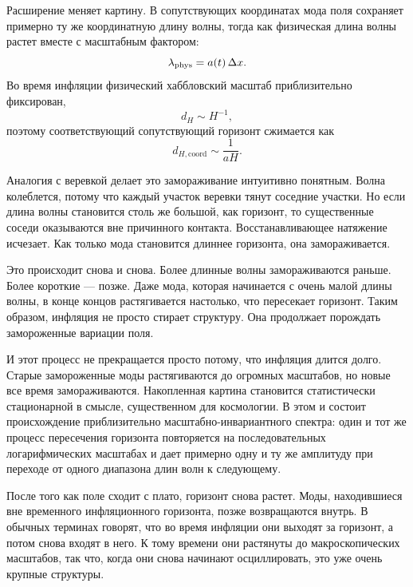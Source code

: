 Расширение меняет картину. В сопутствующих координатах мода поля сохраняет примерно ту же координатную длину волны, тогда как физическая длина волны растет вместе с масштабным фактором:
\begin{equation}
\lambda_{\rm phys}=a(t)\,\Delta x.
\end{equation}
Во время инфляции физический хаббловский масштаб приблизительно фиксирован,
\begin{equation}
d_H\sim H^{-1},
\end{equation}
поэтому соответствующий сопутствующий горизонт сжимается как
\begin{equation}
d_{H,\mathrm{coord}}\sim \frac{1}{aH}.
\end{equation}

Аналогия с веревкой делает это замораживание интуитивно понятным. Волна колеблется, потому что каждый участок веревки тянут соседние участки. Но если длина волны становится столь же большой, как горизонт, то существенные соседи оказываются вне причинного контакта. Восстанавливающее натяжение исчезает. Как только мода становится длиннее горизонта, она замораживается.

Это происходит снова и снова. Более длинные волны замораживаются раньше. Более короткие — позже. Даже мода, которая начинается с очень малой длины волны, в конце концов растягивается настолько, что пересекает горизонт. Таким образом, инфляция не просто стирает структуру. Она продолжает порождать замороженные вариации поля.

И этот процесс не прекращается просто потому, что инфляция длится долго. Старые замороженные моды растягиваются до огромных масштабов, но новые все время замораживаются. Накопленная картина становится статистически стационарной в смысле, существенном для космологии. В этом и состоит происхождение приблизительно масштабно-инвариантного спектра: один и тот же процесс пересечения горизонта повторяется на последовательных логарифмических масштабах и дает примерно одну и ту же амплитуду при переходе от одного диапазона длин волн к следующему.

После того как поле сходит с плато, горизонт снова растет. Моды, находившиеся вне временного инфляционного горизонта, позже возвращаются внутрь. В обычных терминах говорят, что во время инфляции они выходят за горизонт, а потом снова входят в него. К тому времени они растянуты до макроскопических масштабов, так что, когда они снова начинают осциллировать, это уже очень крупные структуры.

\begin{classroomqa}
\end{classroomqa}

